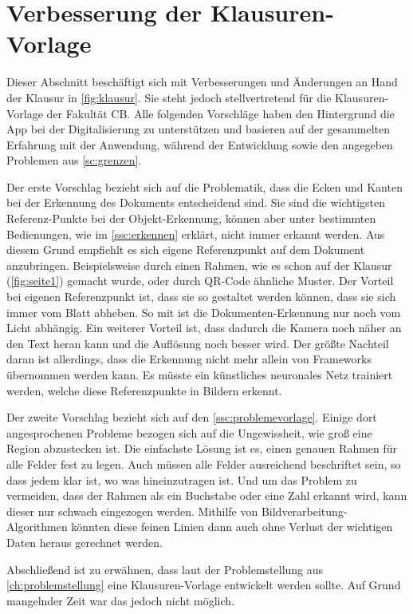 \documentclass[notables, nomenclature, oneside, 150]{HSMW-Thesis}
\begin{document}

	\section{Verbesserung der Klausuren-Vorlage}\label{sc:vorlage}
		Dieser Abschnitt beschäftigt sich mit Verbesserungen und Änderungen an Hand der Klausur in \autoref{fig:klausur}. Sie steht jedoch stellvertretend für die Klausuren-Vorlage der Fakultät CB. Alle folgenden Vorschläge haben den Hintergrund die App bei der Digitalisierung zu unterstützen und basieren auf der gesammelten Erfahrung mit der Anwendung, während der Entwicklung sowie den angegeben Problemen aus \autoref{sc:grenzen}.
	
		Der erste Vorschlag bezieht sich auf die Problematik, dass die Ecken und Kanten bei der Erkennung des Dokuments entscheidend sind. Sie sind die wichtigsten Referenz-Punkte bei der Objekt-Erkennung, können aber unter bestimmten Bedienungen, wie im \autoref{ssc:erkennen} erklärt, nicht immer erkannt werden. Aus diesem Grund empfiehlt es sich eigene Referenzpunkt auf dem Dokument anzubringen. Beispielsweise durch einen Rahmen, wie es schon auf der Klausur (\ref{fig:seite1}) gemacht wurde, oder durch QR-Code ähnliche Muster. Der Vorteil bei eigenen Referenzpunkt ist, dass sie so gestaltet werden können, dass sie sich immer vom Blatt abheben. So mit ist die Dokumenten-Erkennung nur noch vom Licht abhängig. Ein weiterer Vorteil ist, dass dadurch die Kamera noch näher an den Text heran kann und die Auflösung noch besser wird. Der größte Nachteil daran ist allerdings, dass die Erkennung nicht mehr allein von Frameworks übernommen werden kann. Es müsste ein künstliches neuronales Netz trainiert werden, welche diese Referenzpunkte in Bildern erkennt. 
	
		Der zweite Vorschlag bezieht sich auf den \autoref{ssc:problemevorlage}. Einige dort angesprochenen Probleme bezogen sich auf die Ungewissheit, wie groß eine Region abzustecken ist. Die einfachste Lösung ist es, einen genauen Rahmen für alle Felder fest zu legen. Auch müssen alle Felder ausreichend beschriftet sein, so dass jedem klar ist, wo was hineinzutragen ist. Und um das Problem zu vermeiden, dass der Rahmen als ein Buchstabe oder eine Zahl erkannt wird, kann dieser nur schwach eingezogen werden. Mithilfe von Bildverarbeitung-Algorithmen könnten diese feinen Linien dann auch ohne Verlust der wichtigen Daten heraus gerechnet werden. 
		
		Abschließend ist zu erwähnen, dass laut der Problemstellung aus \autoref{ch:problemstellung} eine Klausuren-Vorlage entwickelt werden sollte. Auf Grund mangelnder Zeit war das jedoch nicht möglich. 
\end{document}
